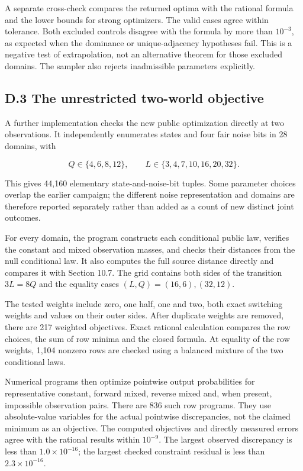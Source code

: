 \documentclass[
]{article}
\begin{document}
A separate cross-check compares the returned optima with the rational
formula and the lower bounds for strong optimizers. The valid cases
agree within tolerance. Both excluded controls disagree with the formula
by more than \(10^{-3}\), as expected when the dominance or
unique-adjacency hypotheses fail. This is a negative test of
extrapolation, not an alternative theorem for those excluded domains.
The sampler also rejects inadmissible parameters explicitly.

\subsection{D.3 The unrestricted two-world
objective}\label{d.3-the-unrestricted-two-world-objective}

A further implementation checks the new public optimization directly at
two observations. It independently enumerates states and four fair noise
bits in 28 domains, with

\[
Q\in\{4,6,8,12\},\qquad
L\in\{3,4,7,10,16,20,32\}.
\]

This gives 44,160 elementary state-and-noise-bit tuples. Some parameter
choices overlap the earlier campaign; the different noise representation
and domains are therefore reported separately rather than added as a
count of new distinct joint outcomes.

For every domain, the program constructs each conditional public law,
verifies the constant and mixed observation masses, and checks their
distances from the null conditional law. It also computes the full
source distance directly and compares it with Section 10.7. The grid
contains both sides of the transition \(3L=8Q\) and the equality cases
\((L,Q)=(16,6),(32,12)\).

The tested weights include zero, one half, one and two, both exact
switching weights and values on their outer sides. After duplicate
weights are removed, there are 217 weighted objectives. Exact rational
calculation compares the row choices, the sum of row minima and the
closed formula. At equality of the row weights, 1,104 nonzero rows are
checked using a balanced mixture of the two conditional laws.

Numerical programs then optimize pointwise output probabilities for
representative constant, forward mixed, reverse mixed and, when present,
impossible observation pairs. There are 836 such row programs. They use
absolute-value variables for the actual pointwise discrepancies, not the
claimed minimum as an objective. The computed objectives and directly
measured errors agree with the rational results within \(10^{-9}\). The
largest observed discrepancy is less than \(1.0\times10^{-16}\); the
largest checked constraint residual is less than \(2.3\times10^{-16}\).
\end{document}
